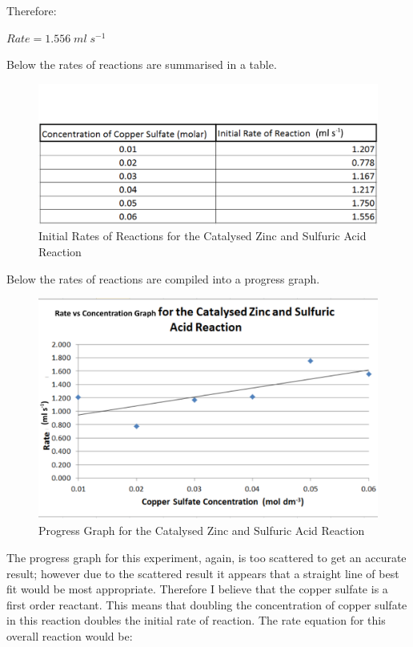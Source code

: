 Therefore:

$Rate = 1.556 \; ml \; s^{-1}$

Below the rates of reactions are summarised in a table.

\begin{figure}[H]
    \includegraphics[width=\textwidth]{./Analysis/Images/3VaryCopperSulfate/Rates.pdf}
    \caption{Initial Rates of Reactions for the Catalysed Zinc and Sulfuric Acid Reaction} \label{fig:RatesSACSVary}
\end{figure}

Below the rates of reactions are compiled into a progress graph.

\begin{figure}[H]
    \includegraphics[width=\textwidth]{./Analysis/Images/3VaryCopperSulfate/ProgressGraph.pdf}
    \caption{Progress Graph for the Catalysed Zinc and Sulfuric Acid Reaction} \label{fig:ProgressGraphSACSVary}
\end{figure}

The progress graph for this experiment, again,  is too scattered to get an accurate result; however due to the scattered result it appears that a straight line of best fit would be most appropriate. Therefore I believe that the copper sulfate is a first order reactant. This means that doubling the concentration of copper sulfate in this reaction doubles the initial rate of reaction. The rate equation for this overall reaction would be:

